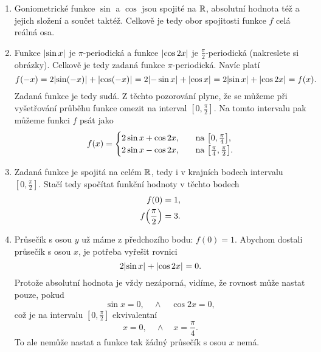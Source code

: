 \documentclass[answers]{exam}
\begin{document}
\begin{questions}
\begin{solution}
\begin{enumerate}
    	\item Goniometrické funkce $\sin$ a $\cos$ jsou spojité na $\mathbb{R}$, absolutní hodnota též a jejich složení a součet taktéž. Celkově je tedy obor spojitosti funkce $f$ celá reálná osa.
    	
    	\item Funkce $\abs{\sin x}$ je $\pi$-periodická a funkce $\abs{\cos 2x}$ je $\frac{\pi}{2}$-periodická (nakreslete si obrázky). Celkově je tedy zadaná funkce $\pi$-periodická. Navíc platí
    	\begin{equation*}
    		f(-x) = 2 \abs{\sin(-x)} + \abs{\cos(-x)} = 2 \abs{- \sin x} + \abs{\cos x} = 2 \abs{\sin x} + \abs{\cos 2x} = f(x).
    	\end{equation*}
    	Zadaná funkce je tedy sudá. Z těchto pozorování plyne, že se můžeme při vyšetřování průběhu funkce omezit na interval $[0, \frac{\pi}{2}]$. Na tomto intervalu pak můžeme funkci $f$ psát jako
    	\begin{equation}
    		\label{eq:1}
    		f(x)
    		=
    		\begin{cases}
    			2 \sin x + \cos 2x, &\quad \text{na $\brackets{0, \frac{\pi}{4}}$,}
    			\\
    			2 \sin x - \cos 2x, &\quad \text{na $\brackets{\frac{\pi}{4}, \frac{\pi}{2}}$.}
    		\end{cases}
    	\end{equation}
    	
    	\item \label{item:4b}
    		Zadaná funkce je spojitá na celém $\mathbb{R}$, tedy i v krajních bodech intervalu $[0, \frac{\pi}{2}]$. Stačí tedy spočítat funkční hodnoty v těchto bodech
    		\begin{align*}
    			f(0)
    			&=
    			1,
    			\\
    			f\parens{\frac{\pi}{2}}
    			&=
    			3.
    		\end{align*}
    	\item 
    		Průsečík s osou $y$ už máme z předchozího bodu: $f(0) = 1$. Abychom dostali průsečík s osou $x$, je potřeba vyřešit rovnici
    		\begin{equation*}
    			2 \abs{\sin x} + \abs{\cos 2x} = 0.
    		\end{equation*}
    		Protože absolutní hodnota je vždy nezáporná, vidíme, že rovnost může nastat pouze, pokud
    		\begin{equation*}
	    		\sin x = 0, \quad \land \quad \cos 2x = 0,
    		\end{equation*}
    		což je na intervalu $[0, \frac{\pi}{2}]$ ekvivalentní
    		\begin{equation*}
    			x = 0, \quad \land \quad x = \frac{\pi}{4}.
    		\end{equation*}
    		To ale nemůže nastat a funkce tak žádný průsečík s osou $x$ nemá.
    		

\end{enumerate}
\end{solution}
\end{questions}
\end{document}
